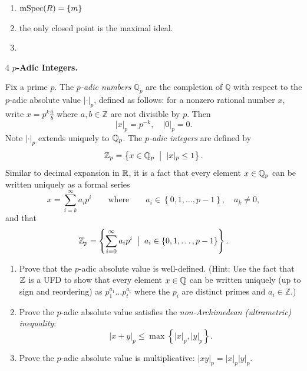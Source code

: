 \documentclass[Notebook.tex]{subfiles}
\begin{document}
    \begin{solution}
        \bbni
         \begin{enumerate}[label=(\alph*),ref=\theenumi\alph*]
            \item $\operatorname{mSpec}(R) = \{m\}$
            \item the only closed point is the maximal ideal. 
            \item 
        \end{enumerate}
    \end{solution}

    \begin{problem}{4}
        \textbf{$p$-Adic Integers.} 
        
        Fix a prime $p$. The \emph{$p$-adic numbers} $\mathbb{Q}_p$ are the completion of $\mathbb{Q}$ with respect to the $p$-adic absolute value $|\cdot|_p$, defined as follows: for a nonzero rational number $x$, write $x = p^k \frac{a}{b}$ where $a,b \in \mathbb{Z}$ are not divisible by $p$. Then
        \[
        |x|_p = p^{-k}, \quad |0|_p = 0.
        \]
        Note $|\cdot|_{p}$ extends uniquely to $\mathbb Q_{p}$. The \emph{$p$-adic integers} are defined by
        \[
        \mathbb Z_p = \left\{x \in \mathbb Q_p \;\; \big| \;\;  |x|_p \leq 1\right\}.
        \]
        Similar to decimal expansion in $\mathbb R$, it is a fact that every element $x \in \mathbb Q_p$ can be written uniquely as a formal series
        \[
        x = \sum_{i=k}^{\infty} a_i p^i  \quad \quad \text{where} \quad \quad a_i \in \left\{0,1,\dots,p-1\right\}, \quad a_k \neq 0,
        \]
        and that
        \[
        \mathbb Z_p = \left\{ \sum_{i=0}^{\infty} a_i p^i \;\; \big| \;\; a_i \in \{0,1,\dots,p-1\} \right\}.
        \]
        \begin{enumerate}[label=(\alph*),ref=\theenumi\alph*]
        \item Prove that the $p$-adic absolute value is well-defined. (Hint: Use the fact that $\mathbb Z$ is a UFD to show that every element $x\in \mathbb Q$ can be written uniquely (up to sign and reordering) as  $p_1^{a_1}\dots p_t^{a_t}$ where the $p_i$ are distinct primes and $a_i \in \mathbb Z$.)
            \item\label{ex-pt:padic-add} Prove the $p$-adic absolute value satisfies the \emph{non-Archimedean (ultrametric) inequality}:
            \[
            |x+y|_p \leq \max\left\{|x|_p, |y|_p\right \}.
            \]
            
            \item\label{ex-pt:padic-mlt}  Prove the $p$-adic absolute value is multiplicative: $|xy|_{p} = |x|_{p}|y|_{p}$.
            

\end{enumerate}
\end{problem}
\end{document}
